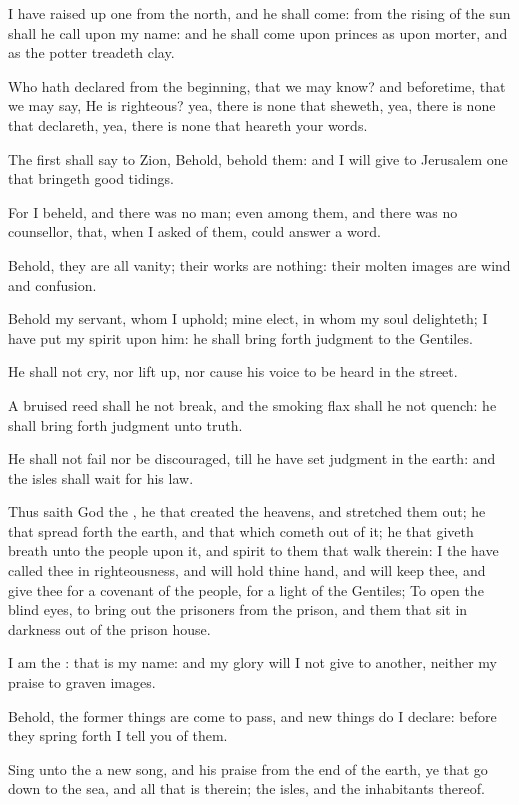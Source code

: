 \Verse I have raised up one from the north, and he shall come: from the rising of the sun shall he call upon my name: and he shall come upon princes as upon morter, and as the potter treadeth clay.

\Verse Who hath declared from the beginning, that we may know? and beforetime, that we may say, He is righteous? yea, there is none that sheweth, yea, there is none that declareth, yea, there is none that heareth your words.

\Verse The first shall say to Zion, Behold, behold them: and I will give to Jerusalem one that bringeth good tidings.

\Verse For I beheld, and there was no man; even among them, and there was no counsellor, that, when I asked of them, could answer a word.

\Verse Behold, they are all vanity; their works are nothing: their molten images are wind and confusion.


\Chapter
\Verse Behold my servant, whom I uphold; mine elect, in whom my soul delighteth; I have put my spirit upon him: he shall bring forth judgment to the Gentiles.

\Verse He shall not cry, nor lift up, nor cause his voice to be heard in the street.

\Verse A bruised reed shall he not break, and the smoking flax shall he not quench: he shall bring forth judgment unto truth.

\Verse He shall not fail nor be discouraged, till he have set judgment in the earth: and the isles shall wait for his law.

\Verse Thus saith God the \LORD, he that created the heavens, and stretched them out; he that spread forth the earth, and that which cometh out of it; he that giveth breath unto the people upon it, and spirit to them that walk therein: \Verse I the \LORD have called thee in righteousness, and will hold thine hand, and will keep thee, and give thee for a covenant of the people, for a light of the Gentiles; \Verse To open the blind eyes, to bring out the prisoners from the prison, and them that sit in darkness out of the prison house.

\Verse I am the \LORD: that is my name: and my glory will I not give to another, neither my praise to graven images.

\Verse Behold, the former things are come to pass, and new things do I declare: before they spring forth I tell you of them.

\Verse Sing unto the \LORD a new song, and his praise from the end of the earth, ye that go down to the sea, and all that is therein; the isles, and the inhabitants thereof.

